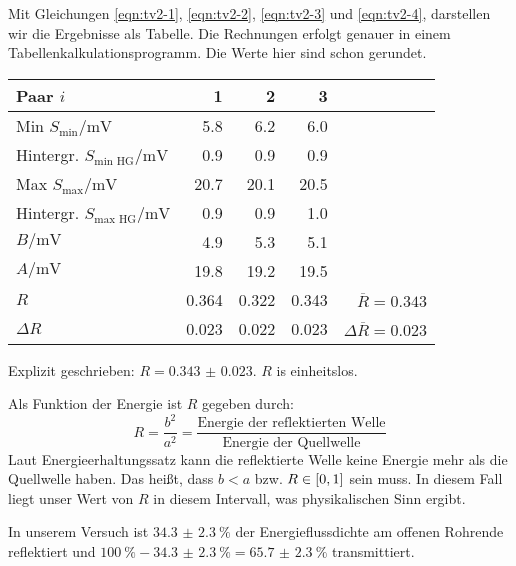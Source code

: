 	Mit Gleichungen \eqref{eqn:tv2-1}, \eqref{eqn:tv2-2}, \eqref{eqn:tv2-3} und \eqref{eqn:tv2-4}, darstellen wir die Ergebnisse als Tabelle. Die Rechnungen erfolgt genauer in einem Tabellenkalkulationsprogramm. Die Werte hier sind schon gerundet. 
	\begin{center}
		\begin{tabular}{lrrr r}
			\toprule
			Paar $i$ & \num{1} & \num{2} & \num{3} & \\
			\midrule
			Min $S_\text{min} / \si{\milli\volt}$ & \num{5.8} & \num{6.2} & \num{6.0} & \\
			Hintergr. $S_\text{min HG} / \si{\milli\volt}$ & \num{0.9} & \num{0.9} & \num{0.9} & \\
			Max $S_\text{max} / \si{\milli\volt}$ &\num{20.7} & \num{20.1} & \num{20.5} & \\
			Hintergr. $S_\text{max HG} / \si{\milli\volt}$ & \num{0.9} & \num{0.9} & \num{1.0} & \\
			\midrule
			$B / \si{\milli\volt}$ & \num{4.9} & \num{5.3} & \num{5.1} & \\
			$A / \si{\milli\volt}$ & \num{19.8} & \num{19.2} & \num{19.5} & \\
			$R$ & \num{0.364} & \num{0.322} & \num{0.343} & $\overbar{R} = \num{0.343}$ \\
			$\Delta R$ & \num{0.023} & \num{0.022} & \num{0.023} & $\Delta \overbar{R} = \num{0.023}$ \\
			\bottomrule
		\end{tabular}
	\end{center}
	Explizit geschrieben: $R = \num{0.343(23)}$. $R$ is einheitslos. 

	Als Funktion der Energie ist $R$ gegeben durch:
	\begin{equation}
		R = \frac{b^2}{a^2} = \frac{\text{Energie der reflektierten Welle}}{\text{Energie der Quellwelle}}
	\end{equation}
	Laut Energieerhaltungssatz kann die reflektierte Welle keine Energie mehr als die Quellwelle haben. Das heißt, dass $b < a$ bzw. $R \in \left[0,1\right]$ sein muss. In diesem Fall liegt unser Wert von $R$ in diesem Intervall, was physikalischen Sinn ergibt.

	In unserem Versuch ist $\SI{34.3(23)}{\percent}$ der Energieflussdichte am offenen Rohrende reflektiert und $\SI{100}{\percent} - \SI{34.3(23)}{\percent} = \SI{65.7(23)}{\percent}$ transmittiert.